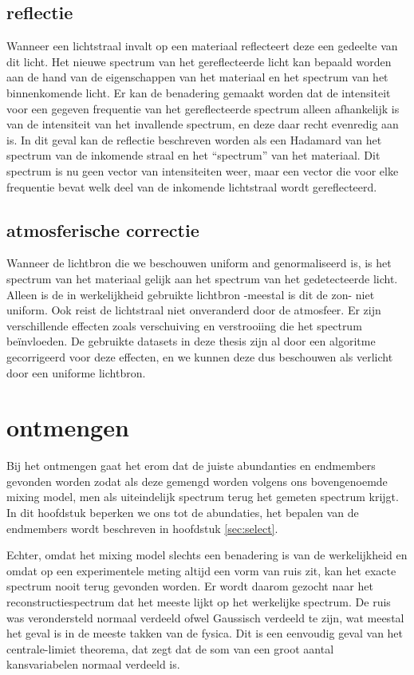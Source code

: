 \documentclass[12pt]{report}
\begin{document}
\subsection{reflectie}

Wanneer een lichtstraal invalt op een materiaal reflecteert deze een gedeelte van dit licht. Het nieuwe spectrum van het gereflecteerde licht kan bepaald worden aan de hand van de eigenschappen van het materiaal en het spectrum van het binnenkomende licht. Er kan de benadering gemaakt worden dat de intensiteit voor een gegeven frequentie van het gereflecteerde spectrum alleen afhankelijk is van de intensiteit van het invallende spectrum, en deze daar recht evenredig aan is. In dit geval kan de reflectie beschreven worden als een Hadamard van het spectrum van de inkomende straal en het ``spectrum'' van het materiaal. Dit spectrum is nu geen vector van intensiteiten weer, maar een vector die voor elke frequentie bevat welk deel van de inkomende lichtstraal wordt gereflecteerd. 

\subsection{atmosferische correctie}

Wanneer de lichtbron die we beschouwen uniform and genormaliseerd is, is het spectrum van het materiaal gelijk aan het spectrum van het gedetecteerde licht. Alleen is de in werkelijkheid gebruikte lichtbron -meestal is dit de zon- niet uniform. Ook reist de lichtstraal niet onveranderd door de atmosfeer. Er zijn verschillende effecten zoals verschuiving en  verstrooiing die het spectrum be\"invloeden. De gebruikte datasets in deze thesis zijn al door een algoritme gecorrigeerd voor deze effecten, en we kunnen deze dus beschouwen als verlicht door een uniforme lichtbron.

\section{ontmengen}

Bij het ontmengen gaat het erom dat de juiste abundanties en endmembers gevonden worden zodat als deze gemengd worden volgens ons bovengenoemde mixing model, men als uiteindelijk spectrum terug het gemeten spectrum krijgt. In dit hoofdstuk beperken we ons tot de abundaties, het bepalen van de endmembers wordt beschreven in hoofdstuk \ref{sec:select}.

Echter, omdat het mixing model slechts een benadering is van de werkelijkheid en omdat op een experimentele meting altijd een vorm van ruis zit, kan het exacte spectrum nooit terug gevonden worden. Er wordt daarom gezocht naar het reconstructiespectrum dat het meeste lijkt op het werkelijke spectrum. De ruis was verondersteld normaal verdeeld ofwel Gaussisch verdeeld te zijn, wat meestal het geval is in de meeste takken van de fysica. Dit is een eenvoudig geval van het centrale-limiet theorema, dat zegt dat de som van een groot aantal kansvariabelen normaal verdeeld is. 
\end{document}
